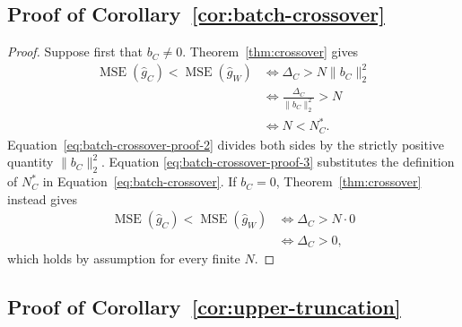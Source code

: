 \subsection{Proof of Corollary~\ref{cor:batch-crossover}}

\begin{proof}
Suppose first that $b_C\ne0$.  Theorem~\ref{thm:crossover} gives
\begin{align}
  \operatorname{MSE}(\widehat g_C)
  <\operatorname{MSE}(\widehat g_W)
  &\iff \Delta_C>N\|b_C\|_2^2
    \label{eq:batch-crossover-proof-1}\\
  &\iff \frac{\Delta_C}{\|b_C\|_2^2}>N
    \label{eq:batch-crossover-proof-2}\\
  &\iff N<N_C^*.
    \label{eq:batch-crossover-proof-3}
\end{align}
Equation~\eqref{eq:batch-crossover-proof-2} divides both sides by the strictly
positive quantity $\|b_C\|_2^2$.  Equation
\eqref{eq:batch-crossover-proof-3} substitutes the definition of $N_C^*$ in
Equation~\eqref{eq:batch-crossover}.  If $b_C=0$, Theorem~\ref{thm:crossover}
instead gives
\begin{align}
  \operatorname{MSE}(\widehat g_C)
  <\operatorname{MSE}(\widehat g_W)
  &\iff \Delta_C>N\cdot0
    \label{eq:batch-crossover-proof-4}\\
  &\iff \Delta_C>0,
    \label{eq:batch-crossover-proof-5}
\end{align}
which holds by assumption for every finite $N$.
\end{proof}

\subsection{Proof of Corollary~\ref{cor:upper-truncation}}

